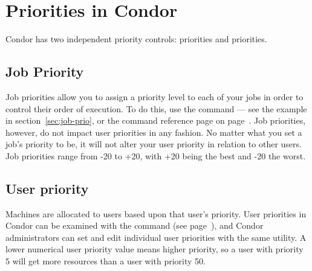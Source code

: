\section{Priorities in Condor}

Condor has two independent priority controls: 
priorities and  priorities.  

\subsection{Job Priority}

Job priorities allow you to assign a priority level to each of your jobs in order to
control their order of execution.  To do this, use the 
command
--- see the example in section~\ref{sec:job-prio}, or the
command reference page on page~\pageref{man-condor-prio}.  Job
priorities, however, do not impact user priorities in any fashion.  No matter what you
set a job's priority to be, it will not alter your user priority in
relation to other users.  Job priorities range from -20 to +20, with +20
being the best and -20 the worst.  

\subsection{\label{sec:user-priority-explained}User priority}

Machines are allocated to users based upon that user's priority. User
priorities in Condor can be examined with the 
command (see page~\pageref{man-condor-userprio}),
and Condor administrators can set and edit individual user priorities
with the same utility. A lower numerical user priority value means
higher priority, so a user with priority 5 will get more resources than
a user with priority 50.  

